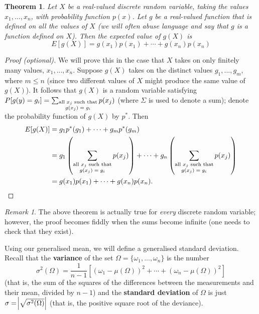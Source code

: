 \documentclass[a4paper,leqno]{article}
\numberwithin{equation}{section}
\newtheorem{thm}[equation]{Theorem}
\theoremstyle{definition}
\theoremstyle{remark}
\newtheorem{rem}[equation]{Remark}
\newcommand{\df}{\textbf}
\begin{document}
\begin{thm}
  Let $ X $ be a real-valued discrete random variable, taking the values $ x_1,...,x_n $, with probability function $ p(x) $.
  Let $ g $ be a real-valued function that is defined on all the values of $ X $ (we will often abuse language and say that $ g $
  is a function defined on $ X $). Then the expected value of $ g(X) $ is
  \begin{displaymath}
    E[g(X)] = g(x_1) p(x_1) + \cdots + g(x_n) p(x_n)
  \end{displaymath}
\end{thm}
\begin{proof}[Proof (optional)]
  We will prove this in the case that $ X $ takes on only finitely many values, $ x_1,...,x_n $. Suppose $ g(X) $ takes on the distinct
  values $ g_1,...,g_m $, where $ m \leq n $ (since two different values of $ X $ might produce the same value of $ g(X) $). It
  follows that $ g(X) $ is a random variable satisfying $ P[g(y) = g_i] = \sum_{\substack{\text{all $ x_j $ such that}\\\text{$g(x_j) = g_i$}}} p(x_j) $ (where $ \Sigma $ is
  used to denote a sum);   denote the probability function of $ g(X) $ by $ p^* $. Then
  \begin{align*}
    E[g(X)] &= g_1 p^*(g_1) + \cdots + g_m p^*(g_m)\\
            &= g_1 \left(\sum_{\substack{\text{all $ x_j $ such that}\\\text{$g(x_j) = g_i$}}} p(x_j)\right) + \cdots + g_n \left(\sum_{\substack{\text{all $ x_j $ such that}\\\text{$g(x_j) = g_i$}}} p(x_j)\right)\\
            &= g(x_1) p(x_1) + \cdots + g(x_n) p(x_n).
  \end{align*}
\end{proof}

\begin{rem}
  The above theorem is actually true for \emph{every} discrete random variable; however, the proof becomes fiddly when the sums become
  infinite (one needs to check that they exist).
\end{rem}

Using our generalised mean, we will define a generalised standard deviation. Recall that the \df{variance} of
the set $ \Omega = \{\omega_1,...,\omega_n\} $ is the number
\begin{displaymath}
  \sigma^2(\Omega) = \frac{1}{n - 1}\left[(\omega_1 - \mu(\Omega))^2 + \cdots + (\omega_n - \mu(\Omega))^2\right]
\end{displaymath}
(that is, the sum of the squares of the differences between the measurements and their mean, divided by $ n - 1 $)
and the \df{standard deviation} of $ \Omega $ is just $ \sigma = \abs{\sqrt{\sigma^2(\Omega)}} $ (that is, the positive
square root of the deviance).
\end{document}
